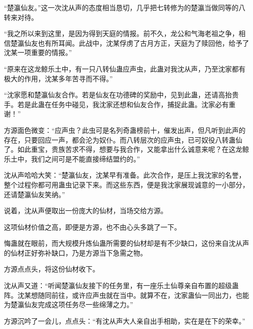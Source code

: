 \begin{this_body}
“楚瀛仙友。”这一次沈从声的态度相当恳切，几乎把七转修为的楚瀛当做同等的八转来对待。

“我之所以来到这里，是因为得到天庭的情报。前不久，龙公和气海老祖之争，相信楚瀛仙友也有所耳闻。此战中，沈某俘虏了古月方正，天庭为了赎回他，给予了沈某一项重要的情报。”

“原来在这龙鲸乐土中，有一只八转仙蛊应声虫，此蛊对我沈从声，乃至沈家都有极大的作用，沈某多年苦寻而不得。”

“沈家愿和楚瀛仙友合作。若是仙友在功德碑的奖励中，见到此蛊，还请高抬贵手。若是此蛊在任务中碰见，我沈家还想和仙友合作，捕捉此蛊。沈家必有重谢！”

方源面色微变：“应声虫？此虫可是名列奇蛊榜前十，催发出声，但凡听到此声的存在，只要回应一声，都会沦为奴仆。而八转层次的应声虫，已可奴役八转蛊仙了。如此重宝，贵族苦求不得，想要与我合作，又能拿出什么诚意来呢？在这龙鲸乐土中，我们之间可是不能直接缔结盟约的。”

沈从声哈哈大笑：“楚瀛仙友，沈某早有准备。此次合作，是压上我沈家的名誉，整个过程你都可用蛊虫记录下来。而这些东西，便是我沈家展现诚意的一小部分，还请楚瀛仙友笑纳。”

说着，沈从声便取出一份庞大的仙材，当场交给方源。

这项仙材价值之高，即便是方源，也不由心头多跳了一下。

悔蛊就在眼前，而大规模升炼仙蛊所需要的仙材却是有不少缺口，这份来自沈从声的仙材正好弥补缺口，乃是方源当下急需之物。

方源点点头，将这份仙材收下。

沈从声又道：“听闻楚瀛仙友接下的任务里，有一座乐土仙尊亲自布置的超级蛊阵。沈某想随同前往，或许应声虫就在当中。就算不在，沈家蛊仙一同出力，也能为楚瀛仙友完成这项任务尽一些绵薄之力。”

方源沉吟了一会儿，点点头：“有沈从声大人亲自出手相助，实在是在下的荣幸。”

\end{this_body}

